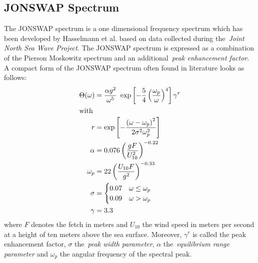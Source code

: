 \subsection{JONSWAP Spectrum}
\label{sec:jonswap}
%
The JONSWAP spectrum is a one dimensional frequency spectrum  which has been 
developed by Hasselmann et al.\cite{article:Hasselman1973} based on data 
collected during the~\emph{Joint North Sea Wave Project}. The JONSWAP spectrum 
is expressed as a combination of the Pierson Moskowitz spectrum and an 
additional~\emph{peak enhancement factor}. A compact form of the JONSWAP
spectrum often found in literature looks as follows:
%
\begin{subequations}
\label{eq:jonswap_omega}
\begin{align}
 \Theta(\omega) &= \frac{\alpha
g^2}{\omega^5}~\exp\left[-\frac{5}{4}\left(\frac{\omega_p}{\omega}
\right)^4\right]\gamma^r\\
\intertext{with}
r& = \exp\left[-\frac{\left(\omega -
\omega_p\right)^2}{2\sigma^2\omega_p^2}\right] \\
\alpha &= 0.076\left(\frac{gF}{U_{10}^2}\right)^{-0.22} \\
\omega_{p} &= 22\left(\frac{U_{10}F}{g^2}\right)^{-0.33} \\
\sigma &= \begin{cases}
	0.07 & \omega\leq\omega_p\\
	0.09 & \omega > \omega_p
    \end{cases} \\
\gamma &= 3.3
\end{align}
\end{subequations}
where $F$ denotes the fetch in meters and $U_{10}$ the wind speed in meters per 
second at a height of ten meters above the sea surface. Moreover, $\gamma^r$ is 
called the peak enhancement factor, $\sigma$ the~\emph{peak width parameter}, 
$\alpha$ the~\emph{equilibrium range parameter} and $\omega_p$ the angular 
frequency of the spectral peak.
%
